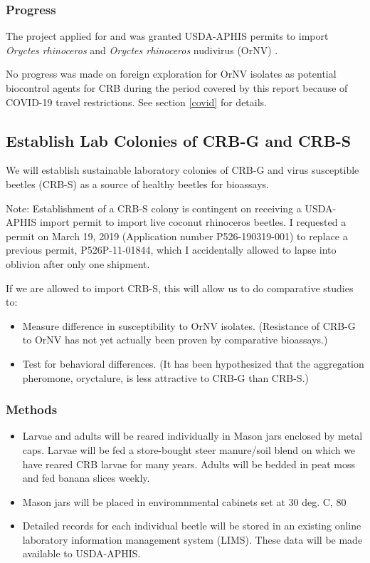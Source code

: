 \documentclass[12pt,letterpaper,english,bibliography=totocnumbered,abstract=on]{scrartcl}
\begin{document}
\subsubsection{Progress}

The project applied for and was granted USDA-APHIS permits to import \textit{Oryctes rhinoceros} \cite{usda-aphis_crb_2019} and \textit{Oryctes rhinoceros} nudivirus (OrNV) \cite{usda-aphisImportPermitOrNV2020}.

No progress was made on foreign exploration for OrNV isolates as potential biocontrol agents for CRB during the period covered by this report because of COVID-19 travel restrictions. See section \ref{covid} for details.

\newpage
\begin{framed}
\subsection{Establish Lab Colonies of CRB-G and CRB-S}

We will establish sustainable laboratory colonies of CRB-G and virus susceptible beetles (CRB-S) as a source of healthy beetles for bioassays.

Note: Establishment of a CRB-S colony is contingent on receiving a USDA-APHIS import permit to import live coconut rhinoceros beetles. I requested a permit on March 19, 2019 (Application number P526-190319-001) to replace a previous permit, P526P-11-01844, which I accidentally allowed to lapse into oblivion after only one shipment.

If we are allowed to import CRB-S, this will allow us to do comparative studies to:

\begin{itemize}
\item Measure difference in susceptibility to OrNV isolates. (Resistance of CRB-G to OrNV has not yet actually been proven by comparative bioassays.)
\item Test for behavioral differences. (It has been hypothesized that the aggregation pheromone, oryctalure, is less attractive to CRB-G than CRB-S.)
\end{itemize}

\subsubsection{Methods}

\begin{itemize}
	\item Larvae and adults will be reared individually in Mason jars enclosed by metal caps. Larvae will be fed a store-bought steer manure/soil blend on which we have reared CRB larvae for many years. Adults will be bedded in peat moss and fed banana slices weekly.
	\item Mason jars will be placed in enviromnmental cabinets set at 30 deg. C, 80%
	\item Detailed records for each individual beetle will be stored in an existing online laboratory information management system (LIMS). These data will be made available to USDA-APHIS.
\end{itemize}
\end{framed}
\end{document}
